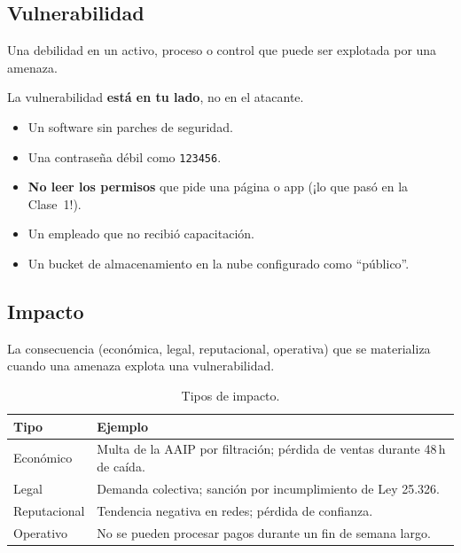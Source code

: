 \documentclass[12pt,a4paper]{article}
\begin{document}
\subsection{Vulnerabilidad}
\begin{cajaDefinicion}
Una debilidad en un activo, proceso o control que puede ser explotada por una amenaza.
\end{cajaDefinicion}

La vulnerabilidad \textbf{está en tu lado}, no en el atacante.
\begin{itemize}[leftmargin=2em]
  \item Un software sin parches de seguridad.
  \item Una contraseña débil como \texttt{123456}.
  \item \textbf{No leer los permisos} que pide una página o app (¡lo que pasó en la Clase~1!).
  \item Un empleado que no recibió capacitación.
  \item Un bucket de almacenamiento en la nube configurado como ``público''.
\end{itemize}

\subsection{Impacto}
\begin{cajaDefinicion}
La consecuencia (económica, legal, reputacional, operativa) que se materializa
cuando una amenaza explota una vulnerabilidad.
\end{cajaDefinicion}

\begin{table}[h!]
\centering
\begin{tabularx}{\textwidth}{lX}
\toprule
\textbf{Tipo} & \textbf{Ejemplo} \\
\midrule
Económico & Multa de la AAIP por filtración; pérdida de ventas durante 48\,h de caída. \\
Legal     & Demanda colectiva; sanción por incumplimiento de Ley 25.326. \\
Reputacional & Tendencia negativa en redes; pérdida de confianza. \\
Operativo & No se pueden procesar pagos durante un fin de semana largo. \\
\bottomrule
\end{tabularx}
\caption{Tipos de impacto.}
\end{table}
\end{document}
